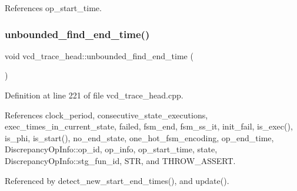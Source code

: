 References op\+\_\+start\+\_\+time.

\mbox{\label{structvcd__trace__head_aefd02e39314983a9e8b2ce299d8482f1}} 
\subsubsection{\texorpdfstring{unbounded\+\_\+find\+\_\+end\+\_\+time()}{unbounded\_find\_end\_time()}}
{\footnotesize\ttfamily void vcd\+\_\+trace\+\_\+head\+::unbounded\+\_\+find\+\_\+end\+\_\+time (\begin{DoxyParamCaption}{ }\end{DoxyParamCaption})\hspace{0.3cm}{\ttfamily [protected]}}



Definition at line 221 of file vcd\+\_\+trace\+\_\+head.\+cpp.



References clock\+\_\+period, consecutive\+\_\+state\+\_\+executions, exec\+\_\+times\+\_\+in\+\_\+current\+\_\+state, failed, fsm\+\_\+end, fsm\+\_\+ss\+\_\+it, init\+\_\+fail, is\+\_\+exec(), is\+\_\+phi, is\+\_\+start(), no\+\_\+end\+\_\+state, one\+\_\+hot\+\_\+fsm\+\_\+encoding, op\+\_\+end\+\_\+time, Discrepancy\+Op\+Info\+::op\+\_\+id, op\+\_\+info, op\+\_\+start\+\_\+time, state, Discrepancy\+Op\+Info\+::stg\+\_\+fun\+\_\+id, S\+TR, and T\+H\+R\+O\+W\+\_\+\+A\+S\+S\+E\+RT.



Referenced by detect\+\_\+new\+\_\+start\+\_\+end\+\_\+times(), and update().

